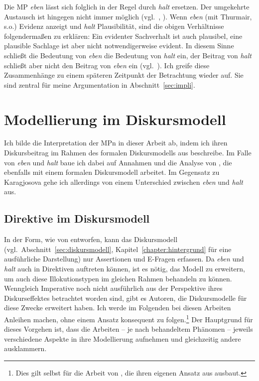 Die MP \textit{eben} lässt sich folglich in der Regel durch \textit{halt} ersetzen. Der umgekehrte Austausch ist hingegen nicht immer möglich (vgl.\ \citealt[128]{Thurmair1989}, \citealt[392]{Ickler1994}). Wenn \textit{eben} (mit Thurmair, s.o.) Evidenz anzeigt und \textit{halt} Plausibilität, sind die obigen Verhältnisse folgendermaßen zu erklären: Ein evidenter Sachverhalt ist auch plausibel, eine plausible Sachlage ist aber nicht notwendigerweise evident. In diesem Sinne schließt die Bedeutung von \textit{eben} die Bedeutung von \textit{halt} ein, der Beitrag von \textit{halt} schließt aber nicht den Beitrag von \textit{eben} ein (vgl.\ \citealt[128]{Thurmair1989}). Ich greife diese Zusammenhänge zu einem späteren Zeitpunkt der Betrachtung wieder auf. Sie sind zentral für meine Argumentation in Abschnitt~\ref{sec:impli}.

\section{Modellierung im Diskursmodell}
\label{sec:modellierung}
Ich bilde die Interpretation der MPn in dieser Arbeit ab, indem ich ihren Diskursbeitrag im Rahmen des formalen Diskursmodells aus \citet{Farkas2010} be\-schreibe. Im Falle von \textit{eben} und \textit{halt} baue ich dabei auf Annahmen und die Analyse von \citet{Karagjosova2003, Karagjosova2004}, die ebenfalls mit einem formalen Diskurs\-modell arbeitet. Im Gegensatz zu Karagjosova gehe ich allerdings von einem Unterschied zwischen \textit{eben} und \textit{halt} aus. 

\subsection{Direktive im Diskursmodell}
\label{sec:dirdm}
In der Form, wie von \citet{Farkas2010} entworfen, kann das Diskursmodell (vgl.\ Abschnitt~\ref{sec:diskursmodell}, Kapitel~\ref{chapter:hintergrund} für eine ausführliche Darstellung) nur Assertionen und E-Fragen erfassen. Da \textit{eben} und \textit{halt} auch in Direktiven  auftreten können, ist es nötig, das Modell zu erweitern, um auch diese Illokutionstypen im gleichen Rahmen behandeln zu können. Wenngleich Imperative noch nicht ausführlich aus der Perspektive ihres Diskurseffektes betrachtet worden sind, gibt es Autoren, die Diskursmodelle für diese Zwecke erweitert haben. Ich werde im Folgenden bei diesen Arbeiten Anleihen machen, ohne einem Ansatz konsequent zu folgen.\footnote{Dies gilt selbst für die Arbeit von \citet{Farkas2011}, die ihren eigenen Ansatz aus \citet{Farkas2010} ausbaut.} Der Hauptgrund für dieses Vorgehen ist, dass die Arbeiten – je nach behandeltem Phänomen – jeweils verschiedene Aspekte in ihre Modellierung aufnehmen und gleichzeitig andere ausklammern.

